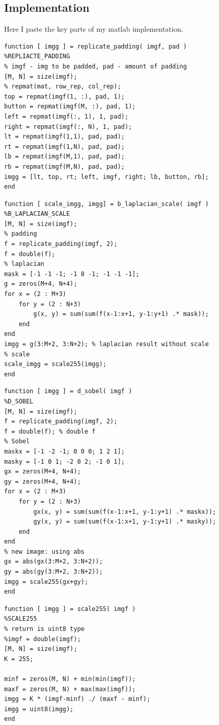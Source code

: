 \subsection{Implementation}
Here I paste the key parts of my matlab implementation.
\lstset{language=Matlab}
\begin{lstlisting}
function [ imgg ] = replicate_padding( imgf, pad )
%REPLIACTE_PADDING
% imgf - img to be padded, pad - amount of padding 
[M, N] = size(imgf);
% repmat(mat, row_rep, col_rep);
top = repmat(imgf(1, :), pad, 1);
button = repmat(imgf(M, :), pad, 1);
left = repmat(imgf(:, 1), 1, pad);
right = repmat(imgf(:, N), 1, pad);
lt = repmat(imgf(1,1), pad, pad);
rt = repmat(imgf(1,N), pad, pad);
lb = repmat(imgf(M,1), pad, pad);
rb = repmat(imgf(M,N), pad, pad);
imgg = [lt, top, rt; left, imgf, right; lb, button, rb];
end
\end{lstlisting}

\lstset{language=Matlab}
\begin{lstlisting}
function [ scale_imgg, imgg] = b_laplacian_scale( imgf )
%B_LAPLACIAN_SCALE 
[M, N] = size(imgf);
% padding
f = replicate_padding(imgf, 2);
f = double(f);
% laplacian
mask = [-1 -1 -1; -1 8 -1; -1 -1 -1];
g = zeros(M+4, N+4);
for x = (2 : M+3)
    for y = (2 : N+3)
        g(x, y) = sum(sum(f(x-1:x+1, y-1:y+1) .* mask));
    end
end
imgg = g(3:M+2, 3:N+2); % laplacian result without scale
% scale
scale_imgg = scale255(imgg);
end
\end{lstlisting}
\lstset{language=Matlab}
\begin{lstlisting}
function [ imgg ] = d_sobel( imgf )
%D_SOBEL 
[M, N] = size(imgf);
f = replicate_padding(imgf, 2);
f = double(f); % double f
% Sobel
maskx = [-1 -2 -1; 0 0 0; 1 2 1];
masky = [-1 0 1; -2 0 2; -1 0 1];
gx = zeros(M+4, N+4);
gy = zeros(M+4, N+4);
for x = (2 : M+3)
    for y = (2 : N+3)
        gx(x, y) = sum(sum(f(x-1:x+1, y-1:y+1) .* maskx));
        gy(x, y) = sum(sum(f(x-1:x+1, y-1:y+1) .* masky));
    end
end
% new image: using abs
gx = abs(gx(3:M+2, 3:N+2));
gy = abs(gy(3:M+2, 3:N+2));
imgg = scale255(gx+gy);
end
\end{lstlisting}
\lstset{language=Matlab}
\begin{lstlisting}
function [ imgg ] = scale255( imgf )
%SCALE255 
% return is uint8 type
%imgf = double(imgf);
[M, N] = size(imgf);
K = 255;

minf = zeros(M, N) + min(min(imgf));
maxf = zeros(M, N) + max(max(imgf));
imgg = K * (imgf-minf) ./ (maxf - minf);
imgg = uint8(imgg);
end
\end{lstlisting}

